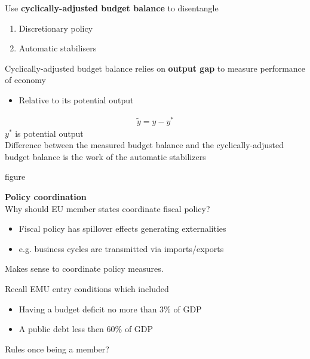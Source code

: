 \documentclass{beamer}
\begin{document}
\begin{frame}
  Use \textbf{cyclically-adjusted budget balance} to disentangle
  \begin{enumerate}
    \item Discretionary policy
    \item Automatic stabilisers
  \end{enumerate}
  \medskip
  Cyclically-adjusted budget balance relies on \textbf{output gap} to measure performance of economy
  \begin{itemize}
    \item Relative to its potential output
  \end{itemize}
\begin{align}
  \tilde{y}=y-y^*
\end{align}
$y^*$ is potential output\\
Difference between the measured budget balance and the cyclically-adjusted budget balance is the work of the automatic stabilizers
\end{frame}

\begin{frame}
  figure
\end{frame}

\begin{frame}
  \textbf{Policy coordination}\\
  Why should EU member states coordinate fiscal policy?
  \begin{itemize}
    \item Fiscal policy has spillover effects generating externalities
    \item e.g. business cycles are transmitted via imports/exports
  \end{itemize}
  \medskip
  Makes sense to coordinate policy measures.  
\end{frame}

\begin{frame} 
 Recall EMU entry conditions which included
\begin{itemize}
  \item Having a budget deficit no more than 3\% of GDP
  \item A public debt less then 60\% of GDP
\end{itemize}
\medskip
Rules once being a member?
\end{frame}
\end{document}
